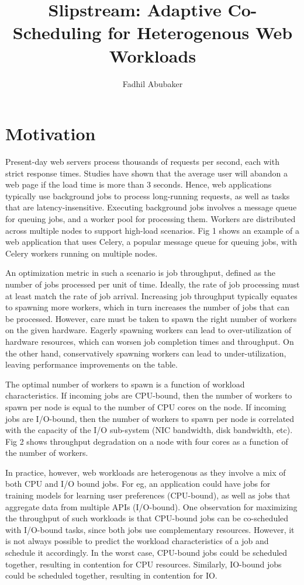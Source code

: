 \documentclass{proc}
\title{Slipstream: Adaptive Co-Scheduling for Heterogenous Web Workloads}
\author{Fadhil Abubaker}
\date{}
\begin{document}
\maketitle

\section{Motivation}

Present-day web servers process thousands of requests per second, each with
strict response times. Studies have shown that the average user will abandon a
web page if the load time is more than 3 seconds. Hence, web applications
typically use background jobs to process long-running requests, as well as tasks
that are latency-insensitive. Executing background jobs involves a message
queue for queuing jobs, and a worker pool for processing them. Workers are
distributed across multiple nodes to support high-load scenarios. Fig 1 shows an
example of a web application that uses Celery, a popular message queue for
queuing jobs, with Celery workers running on multiple nodes.

An optimization metric in such a scenario is job throughput, defined as the
number of jobs processed per unit of time. Ideally, the rate of job processing
must at least match the rate of job arrival. Increasing job throughput typically
equates to spawning more workers, which in turn increases the number of jobs
that can be processed. However, care must be taken to spawn the right number of
workers on the given hardware. Eagerly spawning workers can lead to
over-utilization of hardware resources, which can worsen job completion times
and throughput. On the other hand, conservatively spawning workers can lead to
under-utilization, leaving performance improvements on the table.

The optimal number of workers to spawn is a function of workload
characteristics. If incoming jobs are CPU-bound, then the number of workers to
spawn per node is equal to the number of CPU cores on the node. If incoming jobs
are I/O-bound, then the number of workers to spawn per node is correlated with
the capacity of the I/O sub-system (NIC bandwidth, disk bandwidth, etc). Fig 2
shows throughput degradation on a node with four cores as a function of the
number of workers.

In practice, however, web workloads are heterogenous as they involve a mix of
both CPU and I/O bound jobs. For eg, an application could have jobs for training
models for learning user preferences (CPU-bound), as well as jobs that aggregate
data from multiple APIs (I/O-bound). One observation for maximizing the
throughput of such workloads is that CPU-bound jobs can be co-scheduled with
I/O-bound tasks, since both jobs use complementary resources. However, it is not
always possible to predict the workload characteristics of a job and schedule it
accordingly. In the worst case, CPU-bound jobs could be scheduled together,
resulting in contention for CPU resources. Similarly, IO-bound jobs could be
scheduled together, resulting in contention for IO.
\end{document}
